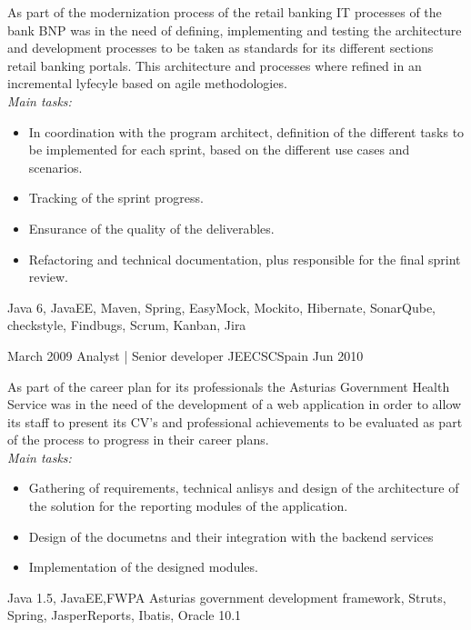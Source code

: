 \begin{experiences}
{As part of the modernization process of the retail banking IT processes of the bank BNP was in
the need of defining, implementing and testing the architecture and development processes to be
taken as standards for its different sections retail banking portals. This architecture and
processes where refined in an incremental lyfecyle based on agile methodologies.  
\\
\emph{Main tasks:}    	
                      \begin{itemize}
                        \item In coordination with the program architect, definition of the different tasks to be implemented for each sprint, based on the different use cases and scenarios.
                        \item Tracking of the sprint progress.                       
                        \item Ensurance of the quality of the deliverables.
                        \item Refactoring and technical documentation,
plus responsible for the final sprint review.
                      \end{itemize}
                    }
                    {Java 6, JavaEE, Maven, Spring, EasyMock, Mockito, Hibernate, SonarQube, checkstyle, Findbugs, Scrum, Kanban, Jira}
                    
  \emptySeparator
  
  \experience
    {March 2009} {Analyst | Senior developer JEE}{CSC}{Spain}
    {Jun 2010}    {

As part of the career plan for its professionals the Asturias Government Health Service was in
the need of the development of a web application in order to allow its staff to present its CV’s
and professional achievements to be evaluated as part of the process to progress in their career
plans.    
\\
\emph{Main tasks:}    	
                      \begin{itemize}
                        \item Gathering of requirements, technical anlisys and design of the architecture of the solution for the reporting modules of the application.
                        \item Design of the documetns and their integration with the backend services                       
                        \item Implementation of the designed modules.
                      \end{itemize}
                    }
                    {Java 1.5, JavaEE,FWPA Asturias government development framework,
Struts, Spring, JasperReports, Ibatis, Oracle 10.1}
                    

\end{experiences}
